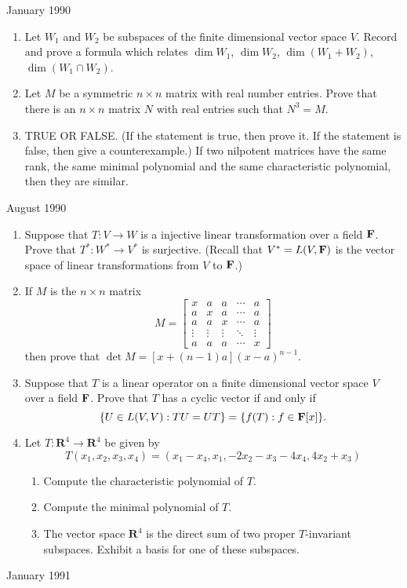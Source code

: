 \documentclass[11pt]{amsart}
\renewcommand{\(}{\left(}
\renewcommand{\)}{\right)}
\renewcommand{\[}{\left[}
\renewcommand{\]}{\right]}
\newcommand{\R}{{\mathbf R}}
\newcommand{\heading}[1]{\centerline{\large\sc #1}}
\newcommand{\num}{\begin{enumerate}}
\newcommand{\enum}{\end{enumerate}}
\newcommand{\fe}{{\bf F}}
\begin{document}
\heading{January 1990}
\num
\item Let $W_1$ and $W_2$ be subspaces of the finite dimensional
vector space $V$.  Record and prove a formula which relates $\dim
W_1$, $\dim W_2$, $\dim (W_1+W_2)$, $\dim (W_1\cap W_2)$.
\item Let $M$ be a symmetric $n\times n$ matrix with real number
entries.  Prove that there is an $n\times n$ matrix $N$ with real
entries such that $N^3=M$.
\item TRUE OR FALSE. (If the statement is true, then prove it.  If
the statement is false, then give a counterexample.)  If two
nilpotent matrices have the same rank, the same minimal polynomial
and the same characteristic polynomial, then they are similar.
\enum

\heading{August 1990} 
\num
\item Suppose that $T:V\to W$ is a injective linear transformation
over a field $\fe$.  Prove that $T^*:W^*\to V^*$ is surjective.
(Recall that $V^*=L(V,\fe)$ is the vector space of linear
transformations from $V$ to $\fe$.)
\item If $M$ is the $n\times n$ matrix
$$
M=\[\begin{array}{ccccc} x& a & a& \cdots & a \\
			a & x & a& \cdots &a \\
			a & a & x& \cdots &a\\
			\vdots& \vdots&\vdots&\ddots&\vdots\\
			a & a& a& \cdots &x\end{array}\]
$$
then prove that $\det M=[x+(n-1)a](x-a)^{n-1}$. 
\item Suppose that $T$ is a linear operator on a finite dimensional
vector space $V$ over a field $\fe$.  Prove that $T$ has a cyclic
vector if and only if
$$
\{U\in L(V,V): TU=UT\}=\{f(T): f\in \fe[x]\}.
$$
\item Let $T:\R^4\to \R^4$ be given by
$$
T(x_1,x_2,x_3,x_4)=(x_1-x_4,x_1,-2x_2-x_3-4x_4,4x_2+x_3)
$$
\num
\item Compute the characteristic polynomial of $T$.
\item Compute the minimal polynomial of $T$.
\item The vector space $\R^4$ is the direct sum of two proper
$T$-invariant subspaces.  Exhibit a basis for one of these
subspaces.
\enum
\enum

\heading{January 1991} 
\end{document}
